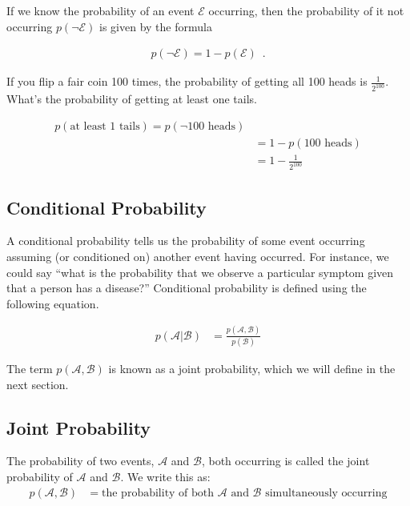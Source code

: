 \documentclass{tufte-handout}
\begin{document}
\noindent If we know the probability of an event $\mathcal{E}$ occurring, then the probability of it not occurring $p(\neg \mathcal{E})$ is given by the formula

\begin{align}
p(\neg \mathcal{E}) = 1 - p(\mathcal{E}) \enspace .
\end{align}

\begin{exercise}
If you flip a fair coin 100 times, the probability of getting all 100 heads is $\frac{1}{2^100}$.  What's the probability of getting at least one tails.
\begin{boxedsolution}
\begin{align}
p(\mbox{at least 1 tails}) = p(\neg \mbox{100 heads}) \nonumber \\
&= 1 - p(\mbox{100 heads}) \nonumber \\
&= 1 - \frac{1}{2^100} \nonumber
\end{align}
\end{boxedsolution}

\end{exercise}

\subsection{Conditional Probability}
A conditional probability tells us the probability of some event occurring assuming (or conditioned on) another event having occurred.  For instance, we could say ``what is the probability that we observe a particular symptom given that a person has a disease?''  Conditional probability is defined using the following equation.

\begin{align}
p(\mathcal{A}|\mathcal{B}) &= \frac{p(\mathcal{A}, \mathcal{B})}{p(\mathcal{B})}
\end{align}

The term $p(\mathcal{A}, \mathcal{B})$ is known as a joint probability, which we will define in the next section.

\subsection{Joint Probability}
The probability of two events, $\mathcal{A}$ and $\mathcal{B}$, both occurring is called the joint probability of $\mathcal{A}$ and $\mathcal{B}$.  We write this as:
\begin{align}
p(\mathcal{A}, \mathcal{B}) &= \mbox{the probability of both $\mathcal{A}$ and $\mathcal{B}$ simultaneously occurring}
\end{align}
\end{document}
